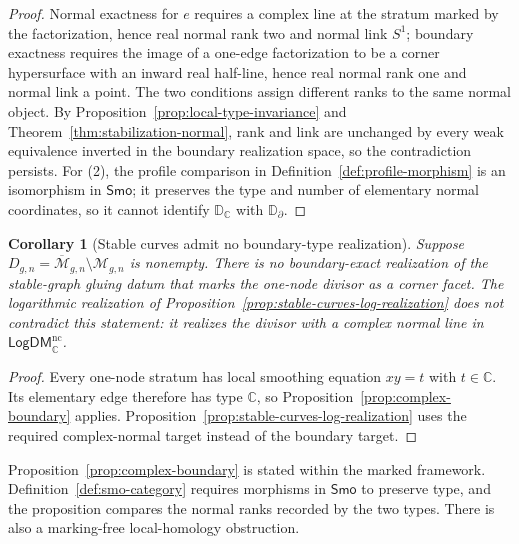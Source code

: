 \documentclass[11pt,letterpaper,twoside]{article}
\theoremstyle{plain}
\newtheorem{corollary}[theorem]{Corollary}
\theoremstyle{definition}
\theoremstyle{remark}
\newcommand{\Smo}{\mathsf{Smo}}
\begin{document}
\begin{proof}
Normal exactness for \(e\) requires a complex line at the stratum marked by the factorization, hence real normal rank two and normal link \(S^1\); boundary exactness requires the image of a one-edge factorization to be a corner hypersurface with an inward real half-line, hence real normal rank one and normal link a point.  The two conditions assign different ranks to the same normal object.  By Proposition~\ref{prop:local-type-invariance} and Theorem~\ref{thm:stabilization-normal}, rank and link are unchanged by every weak equivalence inverted in the boundary realization space, so the contradiction persists.  For (2), the profile comparison in Definition~\ref{def:profile-morphism} is an isomorphism in \(\Smo\); it preserves the type and number of elementary normal coordinates, so it cannot identify \(\mathbb D_{\mathbb C}\) with \(\mathbb D_\partial\).
\end{proof}

\begin{corollary}[Stable curves admit no boundary-type realization]\label{cor:stable-curve-no-boundary}
Suppose \(D_{g,n}=\overline{\mathcal M}_{g,n}\setminus\mathcal M_{g,n}\) is nonempty.  There is no boundary-exact realization of the stable-graph gluing datum that marks the one-node divisor as a corner facet.  The logarithmic realization of Proposition~\ref{prop:stable-curves-log-realization} does not contradict this statement: it realizes the divisor with a complex normal line in \(\mathsf{LogDM}_{\mathbb C}^{\mathrm{nc}}\).
\end{corollary}

\begin{proof}
Every one-node stratum has local smoothing equation \(xy=t\) with \(t\in\mathbb C\).  Its elementary edge therefore has type \(\mathbb C\), so Proposition~\ref{prop:complex-boundary} applies.  Proposition~\ref{prop:stable-curves-log-realization} uses the required complex-normal target instead of the boundary target.
\end{proof}

Proposition~\ref{prop:complex-boundary} is stated within the marked framework.  Definition~\ref{def:smo-category} requires morphisms in \(\Smo\) to preserve type, and the proposition compares the normal ranks recorded by the two types.  There is also a marking-free local-homology obstruction.
\end{document}
